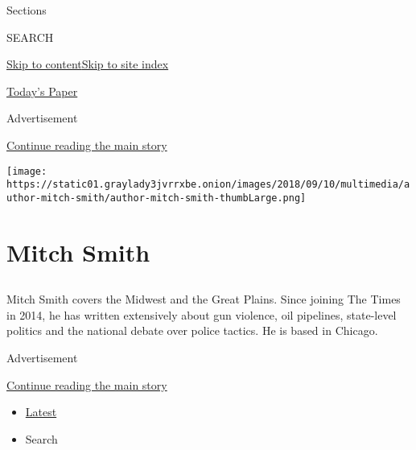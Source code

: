 Sections

SEARCH

\protect\hyperlink{site-content}{Skip to
content}\protect\hyperlink{site-index}{Skip to site index}

\href{https://myaccount.nytimes3xbfgragh.onion/auth/login?response_type=cookie\&client_id=vi}{}

\href{https://www.nytimes3xbfgragh.onion/section/todayspaper}{Today's
Paper}

Advertisement

\protect\hyperlink{after-top}{Continue reading the main story}

\texttt{[image: https://static01.graylady3jvrrxbe.onion/images/2018/09/10/multimedia/author-mitch-smith/author-mitch-smith-thumbLarge.png]}

\hypertarget{mitch-smith}{%
\section{Mitch Smith}\label{mitch-smith}}

\subsection{}

Mitch Smith covers the Midwest and the Great Plains. Since joining The
Times in 2014, he has written extensively about gun violence, oil
pipelines, state-level politics and the national debate over police
tactics. He is based in Chicago.

Advertisement

\protect\hyperlink{after-mid1}{Continue reading the main story}

\begin{itemize}
\tightlist
\item
  \protect\hyperlink{stream-panel}{Latest}
\item
  Search
\end{itemize}


